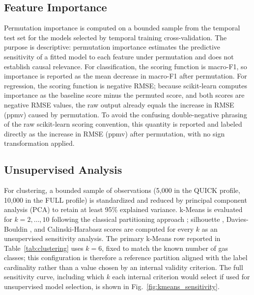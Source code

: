 \documentclass[conference]{IEEEtran}
\begin{document}
\subsection{Feature Importance}
Permutation importance is computed on a bounded sample from the temporal test set for the models selected by temporal training cross-validation. The purpose is descriptive: permutation importance estimates the predictive sensitivity of a fitted model to each feature under permutation and does not establish causal relevance. For classification, the scoring function is macro-F1, so importance is reported as the mean decrease in macro-F1 after permutation. For regression, the scoring function is negative RMSE; because scikit-learn computes importance as the baseline score minus the permuted score, and both scores are negative RMSE values, the raw output already equals the increase in RMSE (ppmv) caused by permutation. To avoid the confusing double-negative phrasing of the raw scikit-learn scoring convention, this quantity is reported and labeled directly as the increase in RMSE (ppmv) after permutation, with no sign transformation applied.

\subsection{Unsupervised Analysis}
For clustering, a bounded sample of observations (5,000 in the QUICK profile, 10,000 in the FULL profile) is standardized and reduced by principal component analysis (PCA) to retain at least 95\% explained variance. k-Means is evaluated for $k=2,\ldots,10$ following the classical partitioning approach \cite{macqueen1967}; silhouette \cite{rousseeuw1987}, Davies-Bouldin \cite{davies1979}, and Calinski-Harabasz \cite{calinski1974} scores are computed for every $k$ as an unsupervised sensitivity analysis. The primary k-Means row reported in Table~\ref{tab:clustering} uses $k=6$, fixed to match the known number of gas classes; this configuration is therefore a reference partition aligned with the label cardinality rather than a value chosen by an internal validity criterion. The full sensitivity curve, including which $k$ each internal criterion would select if used for unsupervised model selection, is shown in Fig.~\ref{fig:kmeans_sensitivity}.
\end{document}
